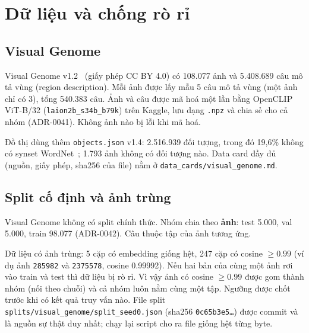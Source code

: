 \documentclass[12pt, a4paper]{article}
\newcommand{\code}[1]{\texttt{#1}}
\begin{document}
\section{Dữ liệu và chống rò rỉ}
\label{sec:data}

\subsection{Visual Genome}
Visual Genome v1.2~\cite{krishna2017vg} (giấy phép CC BY 4.0) có 108.077 ảnh và 5.408.689 câu mô tả vùng (region description). Mỗi ảnh được lấy mẫu 5 câu mô tả vùng (một ảnh chỉ có 3), tổng 540.383 câu. Ảnh và câu được mã hoá một lần bằng OpenCLIP ViT-B/32 (\code{laion2b\_s34b\_b79k}) trên Kaggle, lưu dạng \code{.npz} và chia sẻ cho cả nhóm (ADR-0041). Không ảnh nào bị lỗi khi mã hoá.

Đồ thị dùng thêm \code{objects.json} v1.4: 2.516.939 đối tượng, trong đó 19,6\% không có synset WordNet~\cite{miller1995wordnet}; 1.793 ảnh không có đối tượng nào. Data card đầy đủ (nguồn, giấy phép, sha256 của file) nằm ở \code{data\_cards/visual\_genome.md}.

\subsection{Split cố định và ảnh trùng}
Visual Genome không có split chính thức. Nhóm chia theo \textbf{ảnh}: test 5.000, val 5.000, train 98.077 (ADR-0042). Câu thuộc tập của ảnh tương ứng.

Dữ liệu có ảnh trùng: 5 cặp có embedding giống hệt, 247 cặp có cosine $\ge 0.99$ (ví dụ ảnh \code{285982} và \code{2375578}, cosine 0.99992). Nếu hai bản của cùng một ảnh rơi vào train và test thì dữ liệu bị rò rỉ. Vì vậy ảnh có cosine $\ge 0.99$ được gom thành nhóm (nối theo chuỗi) và cả nhóm luôn nằm cùng một tập. Ngưỡng được chốt trước khi có kết quả truy vấn nào. File split \code{splits/visual\_genome/split\_seed0.json} (sha256 \code{0c65b3e5\dots}) được commit và là nguồn sự thật duy nhất; chạy lại script cho ra file giống hệt từng byte.
\end{document}
